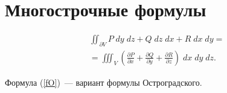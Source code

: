 \documentclass[12pt]{article}
\begin{document}
\section{Многострочные формулы}

\begin{multline}
\label{fO}
\iint_{\partial V} P\;dy\;dz + Q\;dz\;dx + R\;dx\;dy = \\
= \iiint_V \left(\frac{\partial P}{\partial x} + \frac{\partial Q}{\partial y} + \frac{\partial R}{\partial z} \right)\;dx\;dy\;dz.
\end{multline}

Формула (\ref{fO})~--- вариант формулы Остроградского.
\end{document}
